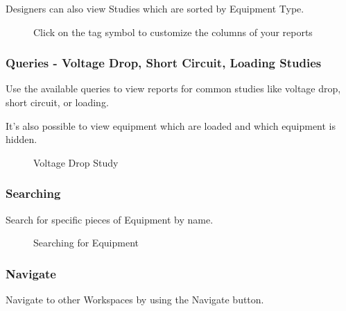\documentclass[letterpaper,10pt,english]{sphinxmanual}
\begin{document}
Designers can also view Studies which are sorted by Equipment Type.

\begin{figure}[H]
\centering
\capstart

\noindent{}
\caption{Click on the tag symbol to customize the columns of your reports}\label{\detokenize{docs/userguide/buildingelectricalmodel/studies/index-studies:id1}}\end{figure}


\subsubsection{Queries - Voltage Drop, Short Circuit, Loading Studies}
\label{\detokenize{docs/userguide/buildingelectricalmodel/studies/index-studies:queries-voltage-drop-short-circuit-loading-studies}}\label{\detokenize{docs/userguide/buildingelectricalmodel/studies/index-studies::doc}}
Use the available queries to view reports for common studies like voltage drop, short circuit, or loading.

It’s also possible to view equipment which are loaded and which equipment is hidden.

\begin{figure}[H]
\centering
\capstart

\noindent{}
\caption{Voltage Drop Study}\label{\detokenize{docs/userguide/buildingelectricalmodel/studies/index-studies:id2}}\end{figure}


\subsubsection{Searching}
\label{\detokenize{docs/userguide/buildingelectricalmodel/studies/index-studies:searching}}
Search for specific pieces of Equipment by name.

\begin{figure}[H]
\centering
\capstart

\noindent{}
\caption{Searching for Equipment}\label{\detokenize{docs/userguide/buildingelectricalmodel/studies/index-studies:id3}}\end{figure}


\subsubsection{Navigate}
\label{\detokenize{docs/userguide/buildingelectricalmodel/studies/index-studies:navigate}}
Navigate to other Workspaces by using the Navigate button.
\end{document}
